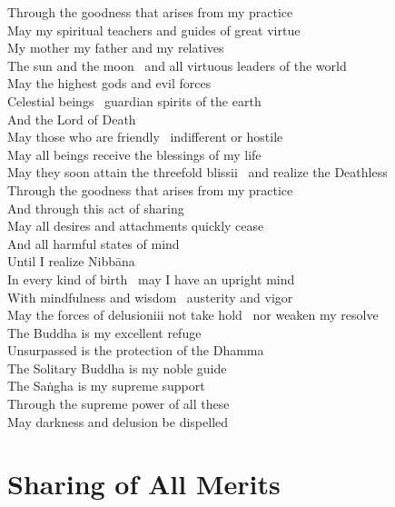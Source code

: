 \begin{english}
  Through the goodness that arises from my practice\\
  May my spiritual teachers and guides of great virtue\\
  My mother my father and my relatives\\
  The sun and the moon \breathmark\ and all virtuous leaders of the world\\
  May the highest gods and evil forces\\
  Celestial beings \breathmark\ guardian spirits of the earth\\
  And the Lord of Death\\
  May those who are friendly \breathmark\ indifferent or hostile\\
  May all beings receive the blessings of my life\\
  May they soon attain the threefold blissii \breathmark\ and realize the Deathless\\
  Through the goodness that arises from my practice\\
  And through this act of sharing\\
  May all desires and attachments quickly cease\\
  And all harmful states of mind\\
  Until I realize Nibbāna\\
  In every kind of birth \breathmark\ may I have an upright mind\\
  With mindfulness and wisdom \breathmark\ austerity and vigor\\
  May the forces of delusioniii not take hold \breathmark\ nor weaken my resolve\\
  The Buddha is my excellent refuge\\
  Unsurpassed is the protection of the Dhamma\\
  The Solitary Buddha is my noble guide\\
  The Saṅgha is my supreme support\\
  Through the supreme power of all these\\
  May darkness and delusion be dispelled
\end{english}

\suttaRef{[Trad]}


\section{Sharing of All Merits}
\label{sharing-all-merits}

